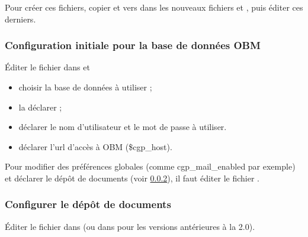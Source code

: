 Pour créer ces fichiers, copier  et 
 vers dans les nouveaux fichiers 
 et , puis éditer 
ces derniers.


\subsubsection{Configuration initiale pour la base de données OBM}

Éditer le fichier  dans  et

\begin{itemize}
\item choisir la base de données à utiliser ; 
\item la déclarer ;
\item déclarer le nom d'utilisateur et le mot de passe à utiliser.
\item déclarer l'url d'accès à OBM (\$cgp\_host).
\end{itemize}


Pour modifier des préférences globales (comme cgp\_mail\_enabled par 
exemple) et déclarer le dépôt de documents (voir \ref{install_doc}), 
il faut éditer le fichier .



\subsubsection{Configurer le dépôt de documents}
\label{install_doc}

Éditer le fichier  dans  (ou 
dans  pour les versions antérieures à la 2.0).

